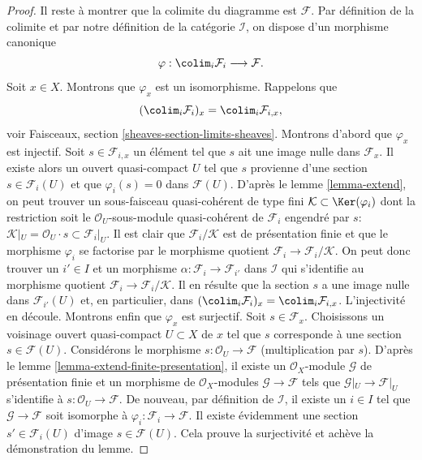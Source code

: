 \begin{proof}
\medskip\noindent
Il reste à montrer que la colimite du diagramme est $\mathcal{F}$.
Par définition de la colimite et par notre définition de la catégorie
$\mathcal{I}$, on dispose d'un morphisme canonique
$$
\varphi :
\colim_i \mathcal{F}_i
\longrightarrow
\mathcal{F}.
$$
Soit $x \in X$. Montrons que $\varphi_x$ est un isomorphisme.
Rappelons que
$$
(\colim_i \mathcal{F}_i)_x
=
\colim_i \mathcal{F}_{i, x},
$$
voir
Faisceaux, section \ref{sheaves-section-limits-sheaves}.
Montrons d'abord que $\varphi_x$ est
injectif. Soit $s \in \mathcal{F}_{i, x}$ un élément
tel que $s$ ait une image nulle dans $\mathcal{F}_x$. Il existe alors un
ouvert quasi-compact $U$ tel que $s$ provienne d'une section $s \in \mathcal{F}_i(U)$
et que $\varphi_i(s) = 0$ dans $\mathcal{F}(U)$.
D'après le lemme \ref{lemma-extend},
on peut trouver un sous-faisceau quasi-cohérent de type fini
$\mathcal{K} \subset \Ker(\varphi_i)$ dont la
restriction soit le $\mathcal{O}_U$-sous-module quasi-cohérent de $\mathcal{F}_i$
engendré par $s$:
$\mathcal{K}|_U = \mathcal{O}_U\cdot s \subset \mathcal{F}_i|_U$.
Il est clair que $\mathcal{F}_i/\mathcal{K}$ est de présentation finie et que le
morphisme $\varphi_i$ se factorise par le morphisme quotient
$\mathcal{F}_i \to \mathcal{F}_i/\mathcal{K}$. On peut donc trouver
un $i' \in I$ et un morphisme $\alpha : \mathcal{F}_i \to \mathcal{F}_{i'}$
dans $\mathcal{I}$ qui s'identifie au morphisme quotient
$\mathcal{F}_i \to \mathcal{F}_i/\mathcal{K}$. Il en résulte
que la section $s$ a une image nulle dans $\mathcal{F}_{i'}(U)$ et,
en particulier, dans
$(\colim_i \mathcal{F}_i)_x =
\colim_i \mathcal{F}_{i, x}$.
L'injectivité en
découle. Montrons enfin que $\varphi_x$ est surjectif.
Soit $s \in \mathcal{F}_x$. Choisissons un voisinage ouvert quasi-compact
$U \subset X$ de $x$ tel que $s$ corresponde à une section
$s \in \mathcal{F}(U)$. Considérons le morphisme
$s : \mathcal{O}_U \to \mathcal{F}$ (multiplication par $s$).
D'après le lemme \ref{lemma-extend-finite-presentation},
il existe un $\mathcal{O}_X$-module $\mathcal{G}$
de présentation finie et un morphisme de $\mathcal{O}_X$-modules
$\mathcal{G} \to \mathcal{F}$ tels que $\mathcal{G}|_U \to \mathcal{F}|_U$
s'identifie à
$s : \mathcal{O}_U \to \mathcal{F}$.
De nouveau, par définition de $\mathcal{I}$, il existe un $i \in I$
tel que $\mathcal{G} \to \mathcal{F}$ soit isomorphe à
$\varphi_i : \mathcal{F}_i \to \mathcal{F}$. Il existe évidemment
une section $s' \in \mathcal{F}_i(U)$ d'image $s \in \mathcal{F}(U)$.
Cela prouve la surjectivité et achève la démonstration du lemme.
\end{proof}

